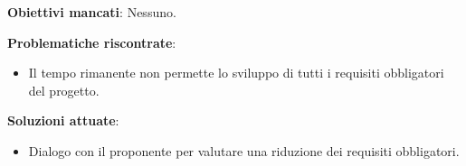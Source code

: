 \textbf{Obiettivi mancati}: Nessuno.

\textbf{Problematiche riscontrate}: 
\begin{itemize}
	\item Il tempo rimanente non permette lo sviluppo di tutti i requisiti obbligatori del progetto.
\end{itemize}

\textbf{Soluzioni attuate}: \begin{itemize}
	\item Dialogo con il proponente per valutare una riduzione dei requisiti obbligatori.
\end{itemize}